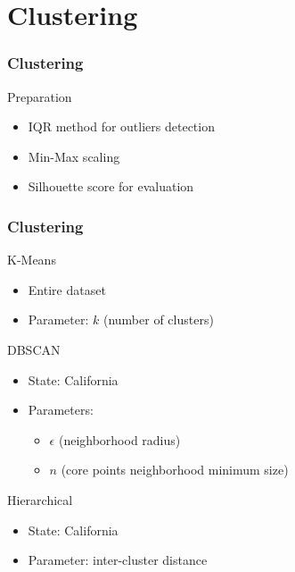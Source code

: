 \section{Clustering}

\begin{frame}
    \frametitle{Clustering}
    \begin{exampleblock}{Preparation }
        
    
        \begin{itemize}
            \item IQR method for outliers detection
            \item Min-Max scaling
            \item Silhouette score for evaluation
        \end{itemize}
    \end{exampleblock}    
\end{frame}


\begin{frame}
    \frametitle{Clustering}

\begin{exampleblock}{K-Means}
    \begin{itemize}
        \item Entire dataset
        \item Parameter: $k$ (number of clusters)
    \end{itemize}
\end{exampleblock}
\begin{exampleblock}{DBSCAN}
    \begin{itemize}
        \item State: California
        \item Parameters: {
            \begin{itemize}
                \item $\epsilon$ (neighborhood radius)
                \item $n$ (core points neighborhood minimum size)
            \end{itemize}
        }
        
    \end{itemize}
\end{exampleblock}
\begin{exampleblock}{Hierarchical}
    \begin{itemize}
        \item State: California
        \item Parameter: inter-cluster distance
    \end{itemize}
\end{exampleblock}

\end{frame}

